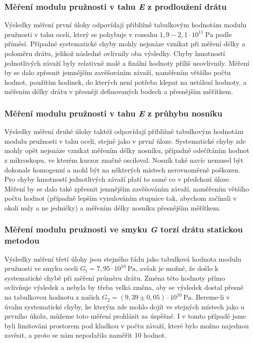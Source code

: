 \documentclass[english]{article}
\newcommand{\unit}[1]{\mathrm{#1}}
\begin{document}
			\subsubsection{Měření modulu pružnosti v tahu \emph{E} z prodloužení drátu}
			        Výsledky měření první úlohy odpovídají přibližně tabulkovým hodnotám \cite{bib:tabulky} modulu pružnosti v tahu oceli, který se pohybuje v rozsahu $1,9 - 2,1\cdot \unit{10^{11}\ Pa}$ podle příměsí. Případné systematické chyby mohly nejsnáze vznikat při měření délky a poloměru drátu, jelikož následně ovlivnily oba výsledky. Chyby hmotností jednotlivých závaží byly relativně malé a finální hodnoty příliš neovlivnily. Měření by se dalo zpřesnit jemnějším zavěšováním závaží, naměřením většího počtu hodnot, použitím hodinek, do kterých není potřeba klepat na ustálení hodnoty, a měřením délky drátu v přesněji definovaných bodech a přesnějším měřítkem. 
			\subsubsection{Měření modulu pružnosti v tahu \emph{E} z průhybu nosníku}
					Výsledky měření druhé úlohy taktéž odpovídají přibližně tabulkovým hodnotám \cite{bib:tabulky} modulu pružnosti v tahu oceli, stejně jako v první úloze. Systematické chyby zde mohly opět nejsnáze vznikat měřením délky nosníku, případně odečítáním hodnot z mikroskopu, ve kterém kurzor značně osciloval. Nosník také navíc nemusel být dokonale homogenní a mohl být na některých místech nerovnoměrně poškozen. Pro chyby hmotností jednotlivých závaží platí to samé co v předchozí úloze. Měření by se dalo také zpřesnit jemnějším zavěšováním závaží, naměřením většího počtu hodnot (případně lepším vynulováním stupnice tak, abychom začínali v okolí nuly a ne jedničky) a měřením délky nosníku přesnějším měřítkem. 
			\subsubsection{Měření modulu pružnosti ve smyku \emph{G} torzí drátu statickou metodou}
					Výsledky měření třetí úlohy jsou stejného řádu jako tabulková hodnota \cite{bib:tabulky} modulu pružnosti ve smyku oceli $G_t = 7,95\cdot \unit{10^{10}\ Pa}$, avšak je možné, že došlo k systematické chybě při měření průměru drátu. Změna této hodnoty přímo ovlivňuje výsledek a nebyla by třeba velká změna, aby se výsledek dostal přesně na tabulkovou hodnotu z našich  $G_2 = (9,39\pm0,05)       \cdot \unit{10^{10}\ Pa}$. Bereme-li v úvahu systematické chyby, ke kterým zde mohlo dojít ve stejných místech jako u prvního úkolu, můžeme toto měření prohlásit za úspěšné. I v tomto případě jsme byli limitováni prostorem pod kladkou v počtu závaží, které bylo možno najednou zavěsit, a proto se nám nepodařilo naměřit 10 hodnot. 
\end{document}
